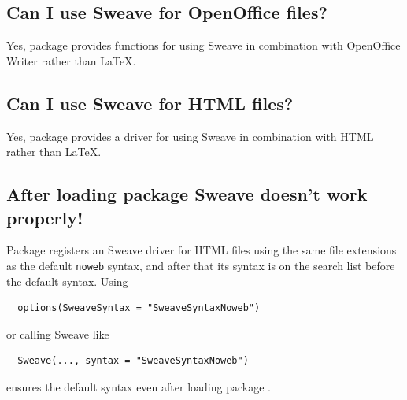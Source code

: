 \documentclass[a4paper]{article}
\begin{document}
  \subsection{Can I use Sweave for OpenOffice files?}

   Yes, package  provides functions for using Sweave in
   combination with OpenOffice Writer rather than \LaTeX.

   \subsection{Can I use Sweave for HTML files?}

   Yes, package  provides a driver for using Sweave in
   combination with HTML rather than \LaTeX.

   \subsection{After loading package  Sweave doesn't
     work properly!}

   Package  registers an Sweave driver for HTML files
   using the same file extensions as the default \texttt{noweb}
   syntax, and after that its syntax is on the search list before the
   default syntax.  Using
\begin{verbatim}
  options(SweaveSyntax = "SweaveSyntaxNoweb")
\end{verbatim}
or calling Sweave like
\begin{verbatim}
  Sweave(..., syntax = "SweaveSyntaxNoweb")
\end{verbatim}
ensures the default syntax even after loading package .
\end{document}
